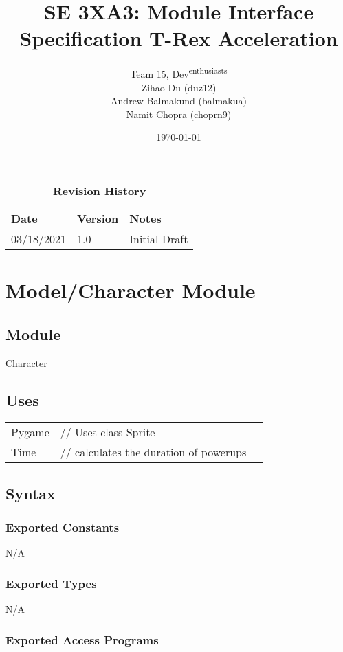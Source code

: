 \documentclass[12pt]{article}
\title{SE 3XA3: Module Interface Specification T-Rex Acceleration}
\author{Team 15, Dev\textsuperscript{enthusiasts}
		\\ Zihao Du (duz12)
		\\ Andrew Balmakund (balmakua) 
		\\ Namit Chopra (choprn9)
}
\date{\today}
\begin{document}
 
\maketitle

\begin{table}[bp]
\caption{\bf Revision History}
\begin{tabularx}{\textwidth}{p{3cm}p{2cm}X}
\toprule {\bf Date} & {\bf Version} & {\bf Notes}\\
\midrule
03/18/2021 & 1.0 & Initial Draft\\
\bottomrule
\end{tabularx}
\end{table}

\newpage

\section* {Model/Character Module}

\subsection*{Module}

Character

\subsection* {Uses}
\begin{tabular}{lll}
    Pygame & // Uses class Sprite  &\\
    Time & // calculates the duration of powerups &\\
\end{tabular}

\subsection* {Syntax}

\subsubsection* {Exported Constants}
N/A
\subsubsection* {Exported Types}
N/A
\subsubsection* {Exported Access Programs}
\end{document}

